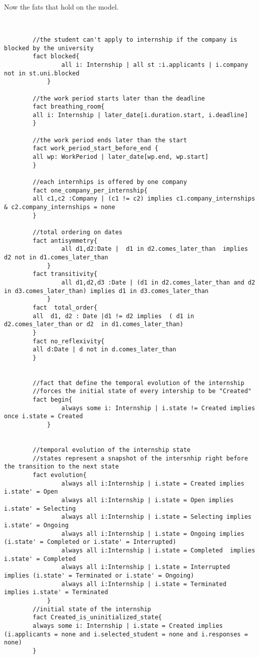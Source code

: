 \par Now the fats that hold on the model.
\begin{lstlisting}[language=Alloy]
            
              
        //the student can't apply to internship if the company is blocked by the university
        fact blocked{
                all i: Internship | all st :i.applicants | i.company not in st.uni.blocked
            }
        
        //the work period starts later than the deadline
        fact breathing_room{
        all i: Internship | later_date[i.duration.start, i.deadline]
        }
        
        //the work period ends later than the start
        fact work_period_start_before_end {
        all wp: WorkPeriod | later_date[wp.end, wp.start]
        }
        
        //each internhips is offered by one company
        fact one_company_per_internship{
        all c1,c2 :Company | (c1 != c2) implies c1.company_internships & c2.company_internships = none
        }
        
        //total ordering on dates
        fact antisymmetry{
                all d1,d2:Date |  d1 in d2.comes_later_than  implies d2 not in d1.comes_later_than
            }
        fact transitivity{
                all d1,d2,d3 :Date | (d1 in d2.comes_later_than and d2 in d3.comes_later_than) implies d1 in d3.comes_later_than
            }
        fact  total_order{
        all  d1, d2 : Date |d1 != d2 implies  ( d1 in d2.comes_later_than or d2  in d1.comes_later_than)
        }
        fact no_reflexivity{
        all d:Date | d not in d.comes_later_than
        }
        
        
        //fact that define the temporal evolution of the internship
        //forces the initial state of every intership to be "Created"
        fact begin{
                always some i: Internship | i.state != Created implies once i.state = Created
            }
        
        
        //temporal evolution of the internship state
        //states represent a snapshot of the intersnhip right before the transition to the next state
        fact evolution{
                always all i:Internship | i.state = Created implies  i.state' = Open
                always all i:Internship | i.state = Open implies  i.state' = Selecting
                always all i:Internship | i.state = Selecting implies  i.state' = Ongoing
                always all i:Internship | i.state = Ongoing implies (i.state' = Completed or i.state' = Interrupted)
                always all i:Internship | i.state = Completed  implies i.state' = Completed
                always all i:Internship | i.state = Interrupted  implies (i.state' = Terminated or i.state' = Ongoing)
                always all i:Internship | i.state = Terminated  implies i.state' = Terminated
            }
        //initial state of the internship
        fact Created_is_uninitialized_state{
        always some i: Internship | i.state = Created implies (i.applicants = none and i.selected_student = none and i.responses = none)
        }
        

\end{lstlisting}

